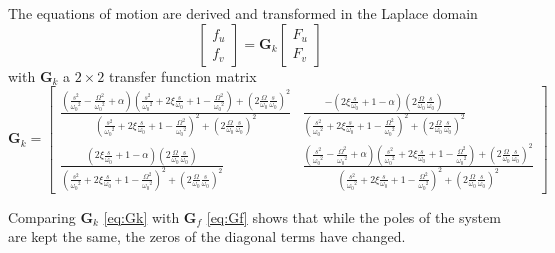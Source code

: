 \documentclass{ISMA_USD2020}
\begin{document}
The equations of motion are derived and transformed in the Laplace domain
\begin{equation}
\label{eq:Gk_mimo_tf}
\begin{bmatrix} f_u \\ f_v \end{bmatrix} =
\bm{G}_k
\begin{bmatrix} F_u \\ F_v \end{bmatrix}
\end{equation}
with \(\bm{G}_k\) a \(2 \times 2\) transfer function matrix
\begin{equation}
\label{eq:Gk}
\bm{G}_k =
\begin{bmatrix}
  \frac{\left( \frac{s^2}{{\omega_0}^2} - \frac{\Omega^2}{{\omega_0}^2} + \alpha \right) \left( \frac{s^2}{{\omega_0}^2} + 2 \xi \frac{s}{\omega_0} + 1 - \frac{{\Omega}^2}{{\omega_0}^2} \right) + \left( 2 \frac{\Omega}{\omega_0} \frac{s}{\omega_0} \right)^2}{\left( \frac{s^2}{{\omega_0}^2} + 2 \xi \frac{s}{\omega_0} + 1 - \frac{{\Omega}^2}{{\omega_0}^2} \right)^2 + \left( 2 \frac{\Omega}{\omega_0} \frac{s}{\omega_0} \right)^2} & \frac{- \left( 2 \xi \frac{s}{\omega_0} + 1 - \alpha \right) \left( 2 \frac{\Omega}{\omega_0} \frac{s}{\omega_0} \right)}{\left( \frac{s^2}{{\omega_0}^2} + 2 \xi \frac{s}{\omega_0} + 1 - \frac{{\Omega}^2}{{\omega_0}^2} \right)^2 + \left( 2 \frac{\Omega}{\omega_0} \frac{s}{\omega_0} \right)^2} \\
  \frac{\left( 2 \xi \frac{s}{\omega_0} + 1 - \alpha \right) \left( 2 \frac{\Omega}{\omega_0} \frac{s}{\omega_0} \right)}{\left( \frac{s^2}{{\omega_0}^2} + 2 \xi \frac{s}{\omega_0} + 1 - \frac{{\Omega}^2}{{\omega_0}^2} \right)^2 + \left( 2 \frac{\Omega}{\omega_0} \frac{s}{\omega_0} \right)^2} & \frac{\left( \frac{s^2}{{\omega_0}^2} - \frac{\Omega^2}{{\omega_0}^2} + \alpha \right) \left( \frac{s^2}{{\omega_0}^2} + 2 \xi \frac{s}{\omega_0} + 1 - \frac{{\Omega}^2}{{\omega_0}^2} \right) + \left( 2 \frac{\Omega}{\omega_0} \frac{s}{\omega_0} \right)^2}{\left( \frac{s^2}{{\omega_0}^2} + 2 \xi \frac{s}{\omega_0} + 1 - \frac{{\Omega}^2}{{\omega_0}^2} \right)^2 + \left( 2 \frac{\Omega}{\omega_0} \frac{s}{\omega_0} \right)^2}
\end{bmatrix}
\end{equation}

Comparing \(\bm{G}_k\) \eqref{eq:Gk} with \(\bm{G}_f\) \eqref{eq:Gf} shows that while the poles of the system are kept the same, the zeros of the diagonal terms have changed.
\end{document}
